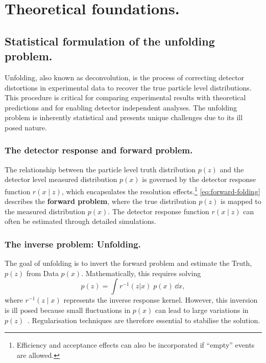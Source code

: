 \chapter{Theoretical foundations.}
\label{chap:theoretical-foundations}
\section{Statistical formulation of the unfolding problem.}

Unfolding, also known as deconvolution, is the process of correcting detector distortions in experimental data to recover the true particle level distributions.
%
This procedure is critical for comparing experimental results with theoretical predictions and for enabling detector independent analyses.
%
The unfolding problem is inherently statistical and presents unique challenges due to its ill posed nature.

\subsection{The detector response and forward problem.}

The relationship between the particle level truth distribution \(p(z)\) and the detector level measured distribution \(p(x)\) is governed by the detector response function \(r(x\mid z)\), which encapsulates the resolution effects.\footnote{Efficiency and acceptance effects can also be incorporated if ``empty'' events are allowed.}
%
\cref{eq:forward-folding} describes the \textbf{forward problem}, where the true distribution \(p(z)\) is mapped to the measured distribution \(p(x)\).
%
The detector response function \(r(x\mid z)\) can often be estimated through detailed simulations.

\subsection{The inverse problem: Unfolding.}

The goal of unfolding is to invert the forward problem and estimate the Truth, \(p(z)\) from Data \(p(x)\).
%
Mathematically, this requires solving
\begin{equation}
    \label{eq:inverse-problem}
    p(z) = \int r^{-1}(z|x) \;p(x) \, \dd x,
\end{equation}
where \(r^{-1}(z\mid x)\) represents the inverse response kernel.
%
However, this inversion is ill posed because small fluctuations in \(p(x)\) can lead to large variations in \(p(z)\)~\cite{2005InverseMeasurements}.
%
Regularisation techniques are therefore essential to stabilise the solution.

